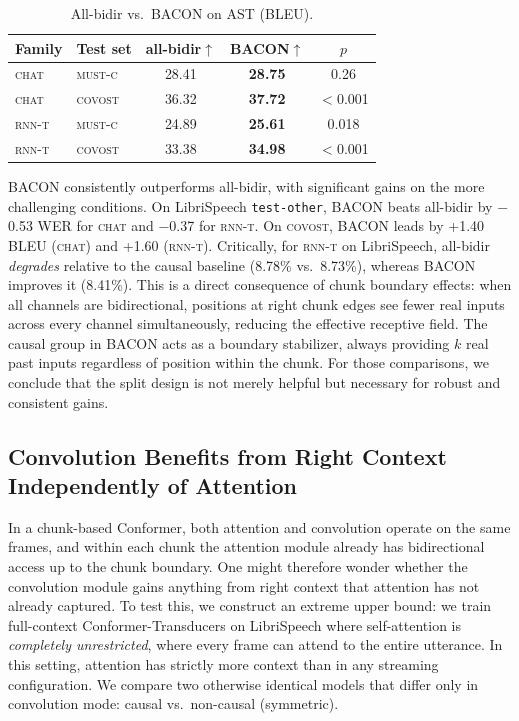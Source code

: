 \documentclass[cameraready]{Interspeech}
\begin{document}
\begin{table}[h]
\centering
\caption{All-bidir vs.\ BACON on AST (BLEU).}
\label{tab:analysis-zero-vs-split-ast}
\begin{tabular}{llccc}
\toprule
\textbf{Family} & \textbf{Test set} & \textbf{all-bidir}$\uparrow$ & \textbf{BACON}$\uparrow$ & $p$ \\
\midrule
\textsc{chat} & \textsc{must-c} & 28.41 & \textbf{28.75} & 0.26 \\
\textsc{chat} & \textsc{covost} & 36.32 & \textbf{37.72} & $<$0.001 \\
\midrule
\textsc{rnn-t} & \textsc{must-c} & 24.89 & \textbf{25.61} & 0.018 \\
\textsc{rnn-t} & \textsc{covost} & 33.38 & \textbf{34.98} & $<$0.001 \\
\bottomrule
\end{tabular}
\end{table}

BACON consistently outperforms all-bidir, with significant gains on the more
challenging conditions. On LibriSpeech
\texttt{test-other}, BACON beats all-bidir by $-$0.53 WER for \textsc{chat} and
$-$0.37 for \textsc{rnn-t}. On \textsc{covost}, BACON leads by +1.40 BLEU
(\textsc{chat}) and +1.60 (\textsc{rnn-t}).
Critically, for \textsc{rnn-t} on LibriSpeech, all-bidir \emph{degrades} relative
to the causal baseline (8.78\% vs.\ 8.73\%), whereas BACON improves it
(8.41\%). 
This is a direct consequence of chunk boundary effects: when all
channels are bidirectional, positions at right chunk edges see fewer real
inputs across every channel simultaneously, reducing the effective receptive
field. The causal group in BACON acts
as a boundary stabilizer, always providing $k$ real past inputs regardless
of position within the chunk. For those comparisons, we conclude that the split design is
not merely helpful but necessary for robust and consistent gains.



\subsection{Convolution Benefits from Right Context Independently of Attention}
\label{subsec:analysis-fullctx}

In a chunk-based Conformer, both attention and convolution operate on the same
frames, and within each chunk the attention module already has bidirectional
access up to the chunk boundary. One might therefore wonder whether the convolution module gains
anything from right context that attention has not already captured.
To test this, we construct an extreme upper bound: we train
full-context Conformer-Transducers on LibriSpeech where self-attention is
\emph{completely unrestricted}, where every frame can attend to the entire utterance.
In this setting, attention has strictly more context than in any streaming
configuration. We compare two otherwise identical models that differ only in
convolution mode: causal vs.\ non-causal (symmetric).
\end{document}
